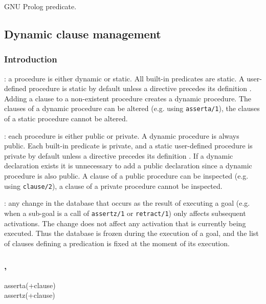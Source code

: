 \Portability

GNU Prolog predicate.


\subsection{Dynamic clause management}

\subsubsection{Introduction}
\label{Introduction:(Dynamic-clause-management)}
: a procedure is either dynamic or
static. All built-in predicates are static. A user-defined procedure is
static by default unless a  directive precedes its
definition . Adding a clause to a non-existent procedure
creates a dynamic procedure. The clauses of a dynamic procedure can be
altered (e.g. using \texttt{asserta/1}), the clauses of a static procedure
cannot be altered.

: each procedure is either public or
private. A dynamic procedure is always public. Each built-in predicate is
private, and a static user-defined procedure is private by default unless a
 directive precedes its definition . If a
dynamic declaration exists it is unnecessary to add a public declaration
since a dynamic procedure is also public. A clause of a public procedure can
be inspected (e.g. using \texttt{clause/2}), a clause of a private procedure
cannot be inspected.

: any change in the database that
occurs as the result of executing a goal (e.g. when a sub-goal is a call of
\texttt{assertz/1} or \texttt{retract/1}) only affects subsequent
activations. The change does not affect any activation that is currently
being executed. Thus the database is frozen during the execution of a goal,
and the list of clauses defining a predication is fixed at the moment of its
execution.

\subsubsection{,
               }

\begin{TemplatesOneCol}
asserta(+clause)\\
assertz(+clause)

\end{TemplatesOneCol}


